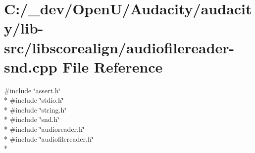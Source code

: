 \hypertarget{audiofilereader-snd_8cpp}{}\section{C\+:/\+\_\+dev/\+Open\+U/\+Audacity/audacity/lib-\/src/libscorealign/audiofilereader-\/snd.cpp File Reference}
\label{audiofilereader-snd_8cpp}
{\ttfamily \#include \char`\"{}assert.\+h\char`\"{}}\\*
{\ttfamily \#include \char`\"{}stdio.\+h\char`\"{}}\\*
{\ttfamily \#include \char`\"{}string.\+h\char`\"{}}\\*
{\ttfamily \#include \char`\"{}snd.\+h\char`\"{}}\\*
{\ttfamily \#include \char`\"{}audioreader.\+h\char`\"{}}\\*
{\ttfamily \#include \char`\"{}audiofilereader.\+h\char`\"{}}\\*
